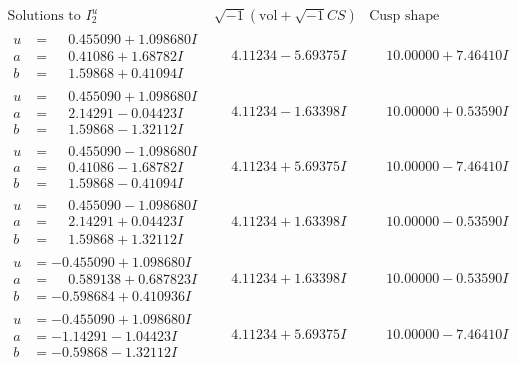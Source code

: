 \documentclass[1p]{elsarticle_modified}
\theoremstyle{definition}
\newcommand{\I}{\sqrt{-1}}
\begin{document}
$$\begin{array}{c|c|c}  
\text{Solutions to }I^u_{2}& \I (\text{vol} + \sqrt{-1}CS) & \text{Cusp shape}\\
 \hline 
\begin{aligned}
u &= \phantom{-}0.455090 + 1.098680 I \\
a &= \phantom{-}0.41086 + 1.68782 I \\
b &= \phantom{-}1.59868 + 0.41094 I\end{aligned}
 & \phantom{-}4.11234 - 5.69375 I & \phantom{-}10.00000 + 7.46410 I \\ \hline\begin{aligned}
u &= \phantom{-}0.455090 + 1.098680 I \\
a &= \phantom{-}2.14291 - 0.04423 I \\
b &= \phantom{-}1.59868 - 1.32112 I\end{aligned}
 & \phantom{-}4.11234 - 1.63398 I & \phantom{-}10.00000 + 0.53590 I \\ \hline\begin{aligned}
u &= \phantom{-}0.455090 - 1.098680 I \\
a &= \phantom{-}0.41086 - 1.68782 I \\
b &= \phantom{-}1.59868 - 0.41094 I\end{aligned}
 & \phantom{-}4.11234 + 5.69375 I & \phantom{-}10.00000 - 7.46410 I \\ \hline\begin{aligned}
u &= \phantom{-}0.455090 - 1.098680 I \\
a &= \phantom{-}2.14291 + 0.04423 I \\
b &= \phantom{-}1.59868 + 1.32112 I\end{aligned}
 & \phantom{-}4.11234 + 1.63398 I & \phantom{-}10.00000 - 0.53590 I \\ \hline\begin{aligned}
u &= -0.455090 + 1.098680 I \\
a &= \phantom{-}0.589138 + 0.687823 I \\
b &= -0.598684 + 0.410936 I\end{aligned}
 & \phantom{-}4.11234 + 1.63398 I & \phantom{-}10.00000 - 0.53590 I \\ \hline\begin{aligned}
u &= -0.455090 + 1.098680 I \\
a &= -1.14291 - 1.04423 I \\
b &= -0.59868 - 1.32112 I\end{aligned}
 & \phantom{-}4.11234 + 5.69375 I & \phantom{-}10.00000 - 7.46410 I \\ \hline\begin{aligned}

\end{aligned}
\end{array}$$
\end{document}
